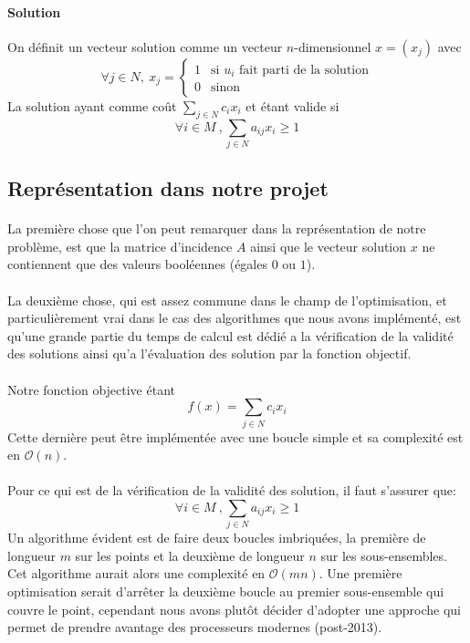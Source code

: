 \documentclass[12pt,letterpaper,twoside]{article}
\begin{document}
			\paragraph*{Solution\\}
				On définit un vecteur solution comme un vecteur \(n\)-dimensionnel \(x = \left(x_j\right)\) avec
				\[\forall j \in N,\ x_j = \left\{
				    \begin{array}{ll}
				        1 & \text{si } u_i \text{ fait parti de la solution}\\
				        0 & \text{sinon}
				    \end{array}
				\right.\]
				La solution ayant comme coût \(\sum_{j \in N}{c_i x_i}\) et étant valide si
				\[\forall i \in M\ ,\sum_{j \in N}{a_{ij}x_i} \ge 1\]
		\subsection{Représentation dans notre projet}
			\paragraph*{}
				La première chose que l'on peut remarquer dans la représentation de notre problème, est que la matrice d'incidence \(A\) ainsi que le vecteur solution \(x\) ne contiennent que des valeurs booléennes (égales \(0\) ou \(1\)).
			\paragraph*{}
				La deuxième chose, qui est assez commune dans le champ de l'optimisation, et particulièrement vrai dans le cas des algorithmes que nous avons implémenté, est qu'une grande partie du temps de calcul est dédié a la vérification de la validité des solutions ainsi qu'a l'évaluation des solution par la fonction objectif.
			\paragraph*{}
				Notre fonction objective étant
				\[f(x) = \sum_{j \in N}{c_i x_i}\]
				Cette dernière peut être implémentée avec une boucle simple et sa complexité est en \(\mathcal{O}(n)\).
			\paragraph*{}
				Pour ce qui est de la vérification de la validité des solution, il faut s'assurer que:
				\[\forall i \in M\ ,\sum_{j \in N}{a_{ij}x_i} \ge 1\]
				Un algorithme évident est de faire deux boucles imbriquées, la première de longueur \(m\) sur les points et la deuxième de longueur \(n\) sur les sous-ensembles. Cet algorithme aurait alors une complexité en \(\mathcal{O}(mn)\). Une première optimisation serait d’arrêter la deuxième boucle au premier sous-ensemble qui couvre le point, cependant nous avons plutôt décider d'adopter une approche qui permet de prendre avantage des processeurs modernes (post-2013).
\end{document}
